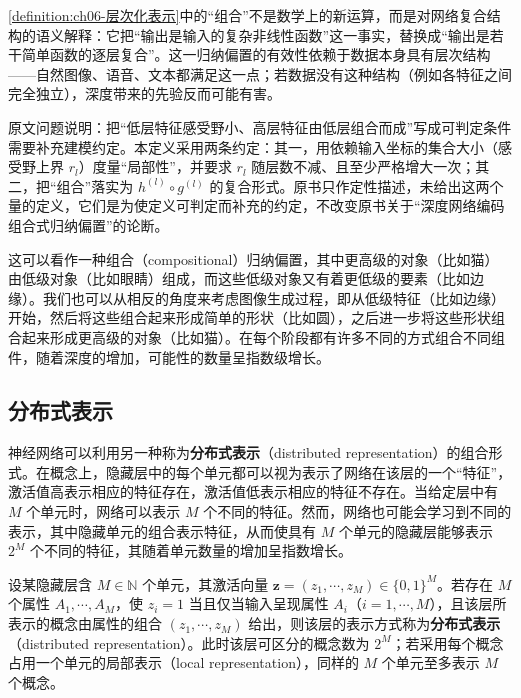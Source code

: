 \documentclass[../../main.tex]{subfiles}
\begin{document}
\begin{remark}\cref{definition:ch06-层次化表示}中的“组合”不是数学上的新运算，而是对网络复合结构的语义解释：它把“输出是输入的复杂非线性函数”这一事实，替换成“输出是若干简单函数的逐层复合”。这一归纳偏置的有效性依赖于数据本身具有层次结构——自然图像、语音、文本都满足这一点；若数据没有这种结构（例如各特征之间完全独立），深度带来的先验反而可能有害。

原文问题说明：把“低层特征感受野小、高层特征由低层组合而成”写成可判定条件需要补充建模约定。本定义采用两条约定：其一，用依赖输入坐标的集合大小（感受野上界 $r_l$）度量“局部性”，并要求 $r_l$ 随层数不减、且至少严格增大一次；其二，把“组合”落实为 $h^{(l)}\circ g^{(l)}$ 的复合形式。原书只作定性描述，未给出这两个量的定义，它们是为使定义可判定而补充的约定，不改变原书关于“深度网络编码组合式归纳偏置”的论断。
\end{remark}

这可以看作一种组合（compositional）归纳偏置，其中更高级的对象（比如猫）由低级对象（比如眼睛）组成，而这些低级对象又有着更低级的要素（比如边缘）。我们也可以从相反的角度来考虑图像生成过程，即从低级特征（比如边缘）开始，然后将这些组合起来形成简单的形状（比如圆），之后进一步将这些形状组合起来形成更高级的对象（比如猫）。在每个阶段都有许多不同的方式组合不同组件，随着深度的增加，可能性的数量呈指数级增长。

\subsection{分布式表示}\label{subsection:ch06-分布式表示}

神经网络可以利用另一种称为\textbf{分布式表示}（distributed representation）的组合形式。在概念上，隐藏层中的每个单元都可以视为表示了网络在该层的一个“特征”，激活值高表示相应的特征存在，激活值低表示相应的特征不存在。当给定层中有 $M$ 个单元时，网络可以表示 $M$ 个不同的特征。然而，网络也可能会学习到不同的表示，其中隐藏单元的组合表示特征，从而使具有 $M$ 个单元的隐藏层能够表示 $2^{M}$ 个不同的特征，其随着单元数量的增加呈指数增长。

\begin{definition}[分布式表示]\label{definition:ch06-分布式表示}
设某隐藏层含 $M\in\mathbb{N}$ 个单元，其激活向量 $\boldsymbol{z}=(z_{1},\cdots,z_{M})\in\{0,1\}^{M}$。若存在 $M$ 个属性 $A_{1},\cdots,A_{M}$，使 $z_{i}=1$ 当且仅当输入呈现属性 $A_{i}$（$i=1,\cdots,M$），且该层所表示的概念由属性的组合 $(z_{1},\cdots,z_{M})$ 给出，则该层的表示方式称为\textbf{分布式表示}（distributed representation）。此时该层可区分的概念数为 $2^{M}$；若采用每个概念占用一个单元的局部表示（local representation），同样的 $M$ 个单元至多表示 $M$ 个概念。
\end{definition}
\end{document}
